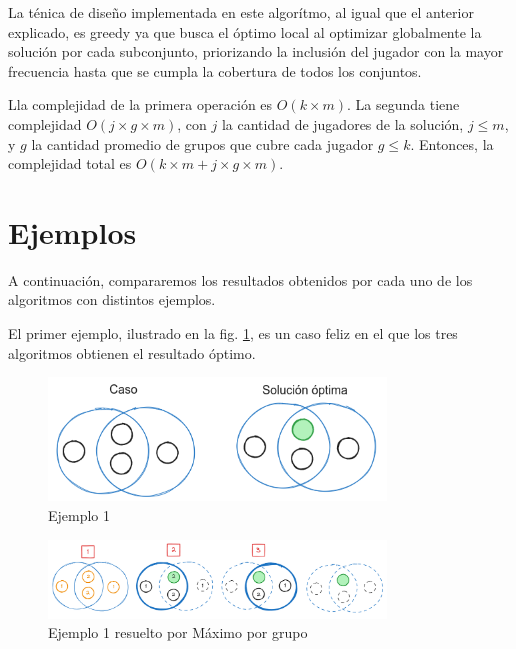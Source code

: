 La ténica de diseño implementada en este algorítmo, al igual que el anterior explicado,  es greedy ya que busca el óptimo local al optimizar globalmente la solución por cada subconjunto, priorizando la inclusión del jugador con la mayor frecuencia hasta que se cumpla la cobertura de todos los conjuntos.



Lla complejidad de la primera operación es $O(k \times m)$. La segunda tiene complejidad $O(j \times g \times m)$, con $j$ la cantidad de jugadores de la solución, $j \leq m$, y $g$ la cantidad promedio de grupos que cubre cada jugador $g \leq k$. Entonces, la complejidad total es $O(k \times m + j \times g \times m)$. %

\section{Ejemplos}

A continuación, compararemos los resultados obtenidos por cada uno de los algoritmos con distintos ejemplos.

El primer ejemplo, ilustrado en la fig. \ref{fig:greedy_ej1}, es un caso feliz en el que los tres algoritmos obtienen el resultado óptimo.

\begin{figure}[H]
    \centering
    \includegraphics[width=0.8\textwidth]{img/greedy_ej1.png}
    \caption{Ejemplo 1}
    \label{fig:greedy_ej1}
\end{figure}

\begin{figure}[H]
    \centering
    \includegraphics[width=0.8\textwidth]{img/greedy_ej1_mpg.png}
    \caption{Ejemplo 1 resuelto por Máximo por grupo}
    \label{fig:greedy_ej1_mpg}
\end{figure}

